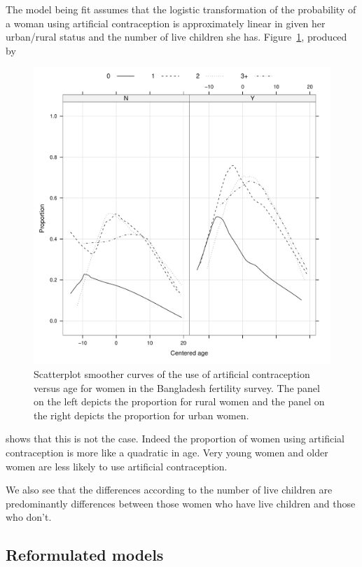 \documentclass[12pt]{article}
\begin{document}
The model being fit assumes that the logistic
transformation of the probability of a woman using artificial
contraception is approximately linear in  given her
urban/rural status and the number of live children she has.
Figure~\ref{fig:Contra1}, produced by
\begin{figure}[tbp]
  \centering
  \includegraphics[width=\textwidth]{figs/SoftRev-Contra1}
  \caption{Scatterplot smoother curves of the use of artificial
    contraception versus age for women in the Bangladesh fertility
    survey. The panel on the left depicts the proportion for rural
    women and the panel on the right depicts the proportion for urban
    women.}
  \label{fig:Contra1}
\end{figure}
shows that this is not the case.  Indeed the proportion of women using
artificial contraception is more like a quadratic in age.  Very young
women and older women are less likely to use artificial contraception.

We also see that the differences according to the number of live
children are predominantly differences between those women who have
live children and those who don't.


\subsection{Reformulated models}
\label{sec:ContraReformulated}
\end{document}
